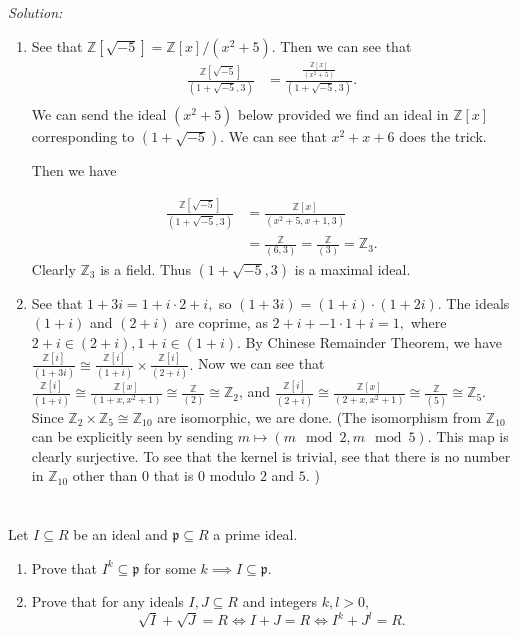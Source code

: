 \documentclass{article}
\begin{document}
\emph{Solution:} \begin{enumerate}
	\item See that $\mathbb{Z}[\sqrt{-5}]=\mathbb{Z}[x]/(x^2+5).$ Then we can see that \begin{align*}
		\frac{\mathbb{Z}[\sqrt{-5}]}{(1+\sqrt{-5},3)} &= \frac{\frac{\mathbb{Z}[x]}{(x^2+5)}}{(1+\sqrt{-5},3)}.\\
	\end{align*}
	We can send the ideal $(x^2+5)$ below provided we find an ideal in $\mathbb{Z}[x]$ corresponding to $(1+\sqrt{-5}).$ We can see that $x^2+x+6$ does the trick.

	Then we have 

	\begin{align*}
		\frac{\mathbb{Z}[\sqrt{-5}]}{(1+\sqrt{-5},3)} &= \frac{\mathbb{Z}[x]}{(x^2+5,x+1,3)}\\
		&= \frac{\mathbb{Z}}{(6,3)}= \frac{\mathbb{Z}}{(3)}=\mathbb{Z}_3.
	\end{align*}
	Clearly $\mathbb{Z}_3$ is a field. Thus $(1+\sqrt{-5},3)$ is a maximal ideal.
	\item See that $1+3i=1+i \cdot 2+i,$ so $(1+3i)=(1+i)\cdot(1+2i).$ The ideals $(1+i)$ and $(2+i)$ are coprime, as $2+i + -1 \cdot 1+i=1,$ where $2+i \in (2+i), 1+i \in (1+i).$
	By Chinese Remainder Theorem, we have $\frac{\mathbb{Z}[i]}{(1+3i)}\cong \frac{\mathbb{Z}[i]}{(1+i)}\times \frac{\mathbb{Z}[i]}{(2+i)}.$ Now we can see that 
	$\frac{\mathbb{Z}[i]}{(1+i)} \cong \frac{\mathbb{Z}[x]}{(1+x,x^2+1)}\cong \frac{\mathbb{Z}}{(2)}\cong \mathbb{Z}_2$, and $\frac{\mathbb{Z}[i]}{(2+i)} \cong \frac{\mathbb{Z}[x]}{(2+x,x^2+1)}\cong \frac{\mathbb{Z}}{(5)}\cong \mathbb{Z}_5$.
	Since $\mathbb{Z}_2 \times \mathbb{Z}_5 \cong \mathbb{Z}_{10}$ are isomorphic, we are done. (The isomorphism from $\mathbb{Z}_{10}$ can be explicitly seen by sending $m \mapsto (m \mod 2,m \mod 5).$ This map is clearly surjective. To see that the kernel is trivial, see that there is no number in $\mathbb{Z}_{10}$ other than $0$ that is $0$ modulo $2$ and $5.$ )
\end{enumerate}
\section{} %
Let $I \subseteq R$ be an ideal and $\mathfrak{p} \subseteq R$ a prime ideal.
\begin{enumerate}
	\item Prove that $I^k \subseteq \mathfrak{p}$ for some $k \implies I \subseteq \mathfrak{p}.$
	\item Prove that for any ideals $I,J \subseteq R$ and integers $k,l >0,$ $$ \sqrt{I}+\sqrt{J}=R \iff I+J=R \iff I^k+J^l=R.$$
\end{enumerate}
\end{document}
